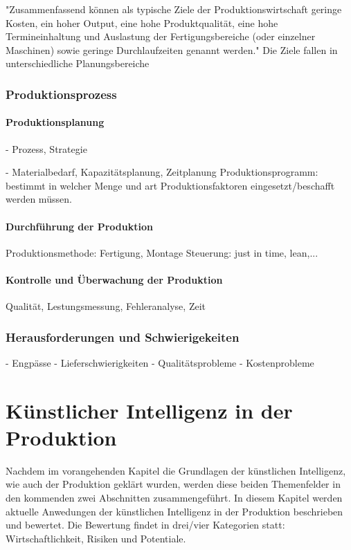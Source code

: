 \documentclass[a4paper,12pt, german]{report}
\begin{document}
"Zusammenfassend können als typische Ziele der Produktionswirtschaft geringe Kosten,
ein hoher Output, eine hohe Produktqualität, eine hohe Termineinhaltung und Auslastung
der Fertigungsbereiche (oder einzelner Maschinen) sowie geringe Durchlaufzeiten
genannt werden." Die Ziele fallen in unterschiedliche Planungsbereiche



\subsection{Produktionsprozess}

\subsubsection{Produktionsplanung}
- Prozess, Strategie

- Materialbedarf, Kapazitätsplanung, Zeitplanung
Produktionsprogramm: bestimmt in welcher Menge und art Produktionsfaktoren eingesetzt/beschafft werden müssen.

\subsubsection{Durchführung der Produktion}
Produktionsmethode: Fertigung, Montage
Steuerung: just in time, lean,...

\subsubsection{Kontrolle und Überwachung der Produktion}
Qualität, Lestungsmessung, Fehleranalyse, Zeit
\subsection{Herausforderungen und Schwierigekeiten}

- Engpässe
- Lieferschwierigkeiten
- Qualitätsprobleme
- Kostenprobleme


\chapter{Künstlicher Intelligenz in der Produktion}

Nachdem im vorangehenden Kapitel die Grundlagen der künstlichen Intelligenz, wie auch der Produktion geklärt wurden, werden diese beiden Themenfelder in den kommenden zwei Abschnitten zusammengeführt. In diesem Kapitel werden aktuelle Anwedungen der künstlichen Intelligenz in der Produktion beschrieben und bewertet. Die Bewertung findet in drei/vier Kategorien statt: Wirtschaftlichkeit, Risiken und Potentiale.
\end{document}
